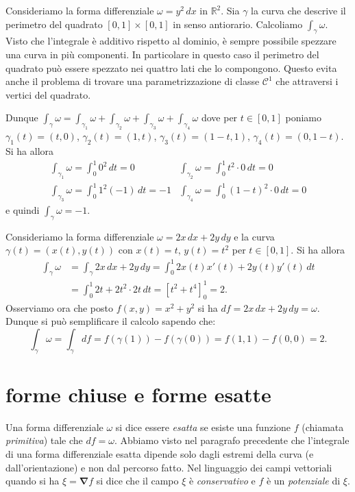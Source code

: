 \documentclass[italian,a4paper]{scrartcl}
\newcommand{\RR}{{\mathbb R}}
\newcommand{\C}{{\mathcal C}}
\newcommand{\vecnabla}{\mathbf{\nabla}}
\begin{document}
\begin{example}
Consideriamo la forma differenziale $\omega = y^2 \, dx$ in $\RR^2$. Sia $\gamma$
la curva che descrive il perimetro del quadrato $[0,1]\times[0,1]$ in
senso antiorario. Calcoliamo $\int_\gamma \omega$. Visto che
l'integrale è additivo rispetto al dominio, è sempre possibile
spezzare una curva in più componenti. In particolare in questo caso il
perimetro del quadrato può essere spezzato nei quattro lati che lo
compongono. Questo evita anche il problema di trovare una
parametrizzazione di classe $\C^1$ che attraversi i vertici del
quadrato.

Dunque $\int_\gamma \omega = \int_{\gamma_1} \omega + \int_{\gamma_2}
\omega + \int_{\gamma_3} \omega + \int_{\gamma_4} \omega$ dove per
$t\in [0,1]$ poniamo $\gamma_1(t)=(t,0)$, $\gamma_2(t)=(1,t)$,
$\gamma_3(t)=(1-t,1)$, $\gamma_4(t)=(0,1-t)$.
Si ha allora
\begin{align*}
\int_{\gamma_1} \omega = \int_0^1 0^2\, dt = 0 &
\int_{\gamma_2} \omega = \int_0^1 t^2 \cdot 0\, dt = 0 \\
\int_{\gamma_3} \omega = \int_0^1 1^2 (-1)\, dt = -1 &
\int_{\gamma_4} \omega = \int_0^1 (1-t)^2\cdot 0\, dt = 0
\end{align*}
e quindi $\int_\gamma \omega = -1$.
\end{example}

\begin{example}
Consideriamo la forma differenziale $\omega = 2x\, dx + 2y \,
dy$ e la curva $\gamma(t) =
(x(t),y(t))$ con $x(t) = t$, $y(t)=t^2$ per $t\in [0,1]$. Si ha allora
\begin{align*}
\int_\gamma \omega
&= \int_\gamma 2x\, dx + 2y\, dy
= \int_0^1 2x(t) x'(t) + 2y(t) y'(t) \, dt\\
&= \int_0^1 2 t + 2 t^2\cdot 2t \, dt
= [ t^2 + t^4 ]_0^1 = 2.
\end{align*}
Osserviamo ora che posto $f(x,y)=x^2+y^2$ si ha $df = 2x\, dx + 2y\, dy =
\omega$. Dunque si può semplificare il calcolo sapendo che:
\[
 \int_\gamma \omega = \int_\gamma df = f(\gamma(1)) - f(\gamma(0))
 = f(1,1) - f(0,0) = 2.
\]
\end{example}

\section{forme chiuse e forme esatte}
Una forma differenziale $\omega$ si dice essere \emph{esatta} se
esiste una funzione $f$ (chiamata \emph{primitiva}) tale che $df = \omega$. Abbiamo visto nel
paragrafo precedente che l'integrale di una forma differenziale esatta
dipende solo dagli estremi della curva (e dall'orientazione) e non dal
percorso fatto. Nel linguaggio dei campi vettoriali quando si ha $\xi =
\vecnabla f$ si dice che il campo $\xi$ è \emph{conservativo} e $f$
è un \emph{potenziale} di $\xi$.
\end{document}
